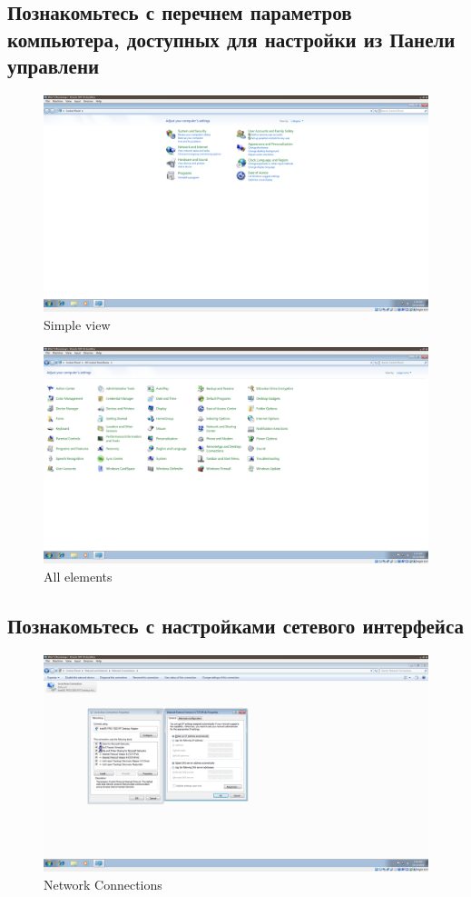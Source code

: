 \documentclass[a4paper]{article}
\begin{document}
\subsection{Познакомьтесь с перечнем параметров компьютера, доступных для настройки из Панели управлени}
\begin{figure}[H]
    \centering
    \includegraphics[width=\linewidth]{39.png}
    \caption{Simple view}
\end{figure}

\begin{figure}[H]
    \centering
    \includegraphics[width=\linewidth]{42.png}
    \caption{All elements}
\end{figure}

\subsection{Познакомьтесь с настройками сетевого интерфейса}
\begin{figure}[H]
    \centering
    \includegraphics[width=\linewidth]{43.png}
    \caption{Network Connections}
\end{figure}
\end{document}
